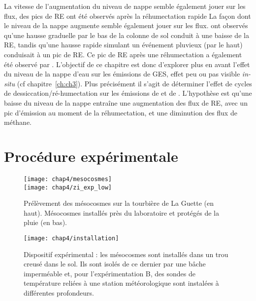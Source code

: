 La vitesse de l'augmentation du niveau de nappe semble également jouer sur les flux, des pics de RE ont été observés après la réhumectation rapide 
La façon dont le niveau de la nappe augmente semble également jouer sur les flux.
\citet{strack2009} ont observés qu'une hausse graduelle par le bas de la colonne de sol conduit à une baisse de la RE, tandis qu'une hausse rapide simulant un événement pluvieux (par le haut) conduisait à un pic de RE.
Ce pic de RE après une réhumectation a également été observé par \citet{mcneil2003}.
L'objectif de ce chapitre est donc d'explorer plus en avant l'effet du niveau de la nappe d'eau sur les émissions de GES, effet peu ou pas visible \textit{in-situ} (cf chapitre~\ref{ch:ch3}).
Plus précisément il s'agit de déterminer l'effet de cycles de dessiccation/ré-humectation sur les émissions de \coo et de \chh. 
L'hypothèse est qu'une baisse du niveau de la nappe entraîne une augmentation des flux de RE, avec un pic d'émission au moment de la réhumectation, et une diminution des flux de méthane.

\section{Procédure expérimentale}


\begin{figure}
\centering
\texttt{[image: chap4/mesocosmes]}\\
\texttt{[image: chap4/zi\_exp\_low]}
\caption{Prélèvement des mésocosmes sur la tourbière de La Guette (en haut). Mésocosmes installés près du laboratoire et protégés de la pluie (en bas).}
\label{fig:mesophoto}
\end{figure}


\begin{figure}
\centering
\texttt{[image: chap4/installation]}
\caption{Dispositif expérimental : les mésocosmes sont installés dans un trou creusé dans le sol. Ils sont isolés de ce dernier par une bâche imperméable et, pour l'expérimentation B, des sondes de température reliées à une station météorologique sont instalées à différentes profondeurs.}
\label{fig:mesocarte}
\end{figure}


